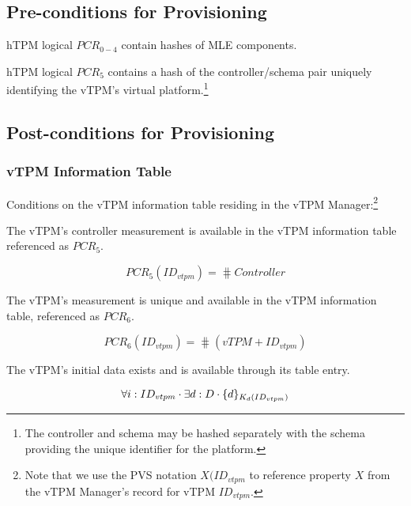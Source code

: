 \documentclass[10pt]{article}
\begin{document}
\subsection*{Pre-conditions for Provisioning}

\begin{pre}
  hTPM logical $PCR_{0-4}$ contain hashes of MLE components.
\end{pre}

\begin{pre}
  hTPM logical $PCR_5$ contains a hash of the controller/schema pair
  uniquely identifying the vTPM's virtual platform.\footnote{The
    controller and schema may be hashed separately with the schema
    providing the unique identifier for the platform.}
\end{pre}

\subsection*{Post-conditions for Provisioning}

\subsubsection*{vTPM Information Table}

Conditions on the vTPM information table residing in the vTPM
Manager:\footnote{Note that we use the PVS notation $X(ID_{vtpm}$ to
  reference property $X$ from the vTPM Manager's record for vTPM $ID_{vtpm}$.}


\begin{post}
  The vTPM's controller measurement is available in the vTPM
  information table referenced as $PCR_5$.

  \[PCR_5(ID_{vtpm}) = \hash{Controller}\]

\end{post}

\begin{post}
  The vTPM's measurement is unique and available in the vTPM
  information table, referenced as $PCR_6$.

  \[PCR_6(ID_{vtpm}) = \hash{(vTPM+ID_{vtpm})}\]

\end{post}

\begin{post}
  The vTPM's initial data exists and is available through its table entry.

  \[\forall i:ID_{vtpm} \cdot \exists d:D \cdot \{d\}_{K_{d}(ID_{vtpm})}\]
\end{post}
\end{document}
